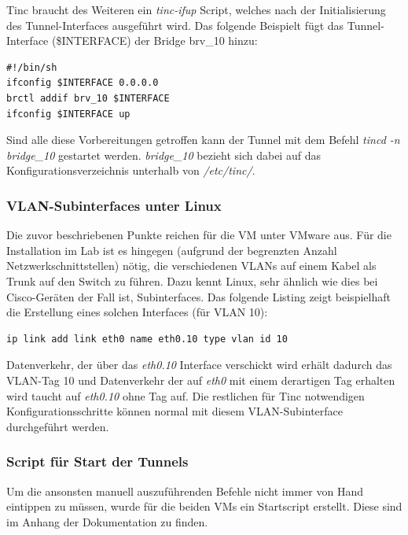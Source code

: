 Tinc braucht des Weiteren ein \emph{tinc-ifup} Script, welches nach der Initialisierung des Tunnel-Interfaces ausgeführt wird. Das folgende Beispielt fügt das Tunnel-Interface (\$INTERFACE) der Bridge brv\_10 hinzu:

\begin{lstlisting}
#!/bin/sh
ifconfig $INTERFACE 0.0.0.0
brctl addif brv_10 $INTERFACE
ifconfig $INTERFACE up
\end{lstlisting}

Sind alle diese Vorbereitungen getroffen kann der Tunnel mit dem Befehl \emph{tincd -n bridge\_10} gestartet werden. \emph{bridge\_10} bezieht sich dabei auf das Konfigurationsverzeichnis unterhalb von \emph{/etc/tinc/}.

\subsubsection{VLAN-Subinterfaces unter Linux}
Die zuvor beschriebenen Punkte reichen für die VM unter VMware aus. Für die Installation im Lab ist es hingegen (aufgrund der begrenzten Anzahl Netzwerkschnittstellen) nötig, die verschiedenen VLANs auf einem Kabel als Trunk auf den Switch zu führen. Dazu kennt Linux, sehr ähnlich wie dies bei Cisco-Geräten der Fall ist, Subinterfaces. Das folgende Listing zeigt beispielhaft die Erstellung eines solchen Interfaces (für VLAN 10):

\begin{lstlisting}
ip link add link eth0 name eth0.10 type vlan id 10
\end{lstlisting}

Datenverkehr, der über das \emph{eth0.10} Interface verschickt wird erhält dadurch das VLAN-Tag 10 und Datenverkehr der auf \emph{eth0} mit einem derartigen Tag erhalten wird taucht auf \emph{eth0.10} ohne Tag auf. Die restlichen für Tinc notwendigen Konfigurationsschritte können normal mit diesem VLAN-Subinterface durchgeführt werden.

\subsubsection{Script für Start der Tunnels}
Um die ansonsten manuell auszuführenden Befehle nicht immer von Hand eintippen zu müssen, wurde für die beiden VMs ein Startscript erstellt. Diese sind im Anhang der Dokumentation zu finden.
